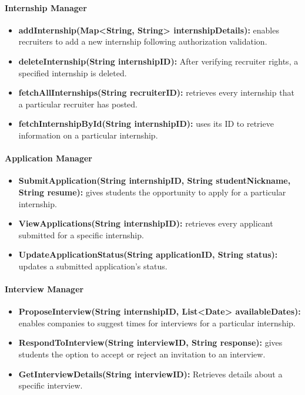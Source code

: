 \paragraph{Internship Manager}
\begin{itemize}
    \item \textbf{addInternship(Map<String, String> internshipDetails):} enables recruiters to add a new internship following authorization validation.
    \item \textbf{deleteInternship(String internshipID):} After verifying recruiter rights, a specified internship is deleted.
    \item \textbf{fetchAllInternships(String recruiterID):} retrieves every internship that a particular recruiter has posted.
    \item \textbf{fetchInternshipById(String internshipID):} uses its ID to retrieve information on a particular internship.
\end{itemize}

\paragraph{Application Manager}
\begin{itemize}
    \item \textbf{SubmitApplication(String internshipID, String studentNickname, String resume):} gives students the opportunity to apply for a particular internship.
    \item \textbf{ViewApplications(String internshipID):} retrieves every applicant submitted for a specific internship.
    \item \textbf{UpdateApplicationStatus(String applicationID, String status):} updates a submitted application's status.
\end{itemize}

\paragraph{Interview Manager}
\begin{itemize}
    \item \textbf{ProposeInterview(String internshipID, List<Date> availableDates):} enables companies to suggest times for interviews for a particular internship.
    \item \textbf{RespondToInterview(String interviewID, String response):} gives students the option to accept or reject an invitation to an interview.
    \item \textbf{GetInterviewDetails(String interviewID):} Retrieves details about a specific interview.
\end{itemize}

